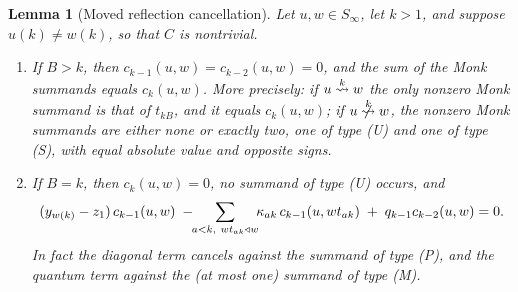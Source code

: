 \documentclass{amsart}
\newtheorem{lemma}{Lemma}[section]
\theoremstyle{definition}
\theoremstyle{remark}
\numberwithin{equation}{section}
\newcommand{\xrightsquigarrow}[2][]{%
	\mathrel{\mathop{\rightsquigarrow}\limits^{\scriptstyle #2}%
	\ifx\hfuzz#1\hfuzz\else_{\scriptstyle #1}\fi}%
}
\newcommand{\tom}[1]{\ensuremath{\xrightsquigarrow{#1}}}
\begin{document}
\begin{lemma}[Moved reflection cancellation] \label{lemma:movedcancel}
Let $u,w\in S_\infty$, let $k>1$, and suppose $u(k)\neq w(k)$, so that $C$ is nontrivial.
\begin{enumerate}
\item[(a)] If $B>k$, then $c_{k-1}(u,w)=c_{k-2}(u,w)=0$, and the sum of the Monk summands equals $c_k(u,w)$. More precisely: if $u\tom{k}w$ the only nonzero Monk summand is that of $t_{kB}$, and it equals $c_k(u,w)$; if $u\ntom{k}w$, the nonzero Monk summands are either none or exactly two, one of type (U) and one of type (S), with equal absolute value and opposite signs.
\item[(b)] If $B=k$, then $c_k(u,w)=0$, no summand of type (U) occurs, and
$$(y_{w(k)}-z_1)\,c_{k-1}(u,w)\;-\!\!\sum_{\substack{a<k,\ wt_{ak}\triangleleft w}}\!\!\kappa_{ak}\,c_{k-1}(u,wt_{ak})\;+\;q_{k-1}c_{k-2}(u,w)=0.$$
In fact the diagonal term cancels against the summand of type (P), and the quantum term against the (at most one) summand of type (M).
\end{enumerate}
\end{lemma}
\end{document}
